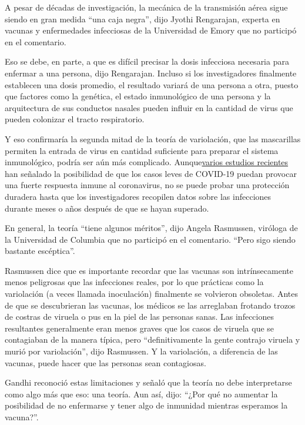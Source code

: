A pesar de décadas de investigación, la mecánica de la transmisión aérea
sigue siendo en gran medida ``una caja negra'', dijo Jyothi Rengarajan,
experta en vacunas y enfermedades infecciosas de la Universidad de Emory
que no participó en el comentario.

Eso se debe, en parte, a que es difícil precisar la dosis infecciosa
necesaria para enfermar a una persona, dijo Rengarajan. Incluso si los
investigadores finalmente establecen una dosis promedio, el resultado
variará de una persona a otra, puesto que factores como la genética, el
estado inmunológico de una persona y la arquitectura de sus conductos
nasales pueden influir en la cantidad de virus que pueden colonizar el
tracto respiratorio.

Y eso confirmaría la segunda mitad de la teoría de variolación, que las
mascarillas permiten la entrada de virus en cantidad suficiente para
preparar el sistema inmunológico, podría ser aún más complicado.
Aunque\href{https://www.nytimes3xbfgragh.onion/2020/08/16/health/coronavirus-immunity-antibodies.html}{varios
estudios recientes} han señalado la posibilidad de que los casos leves
de COVID-19 puedan provocar una fuerte respuesta inmune al coronavirus,
no se puede probar una protección duradera hasta que los investigadores
recopilen datos sobre las infecciones durante meses o años después de
que se hayan superado.

En general, la teoría ``tiene algunos méritos'', dijo Angela Rasmussen,
viróloga de la Universidad de Columbia que no participó en el
comentario. ``Pero sigo siendo bastante escéptica''.

Rasmussen dice que es importante recordar que las vacunas son
intrínsecamente menos peligrosas que las infecciones reales, por lo que
prácticas como la variolación (a veces llamada inoculación) finalmente
se volvieron obsoletas. Antes de que se descubrieran las vacunas, los
médicos se las arreglaban frotando trozos de costras de viruela o pus en
la piel de las personas sanas. Las infecciones resultantes generalmente
eran menos graves que los casos de viruela que se contagiaban de la
manera típica, pero ``definitivamente la gente contrajo viruela y murió
por variolación'', dijo Rasmussen. Y la variolación, a diferencia de las
vacunas, puede hacer que las personas sean contagiosas.

Gandhi reconoció estas limitaciones y señaló que la teoría no debe
interpretarse como algo más que eso: una teoría. Aun así, dijo: ``¿Por
qué no aumentar la posibilidad de no enfermarse y tener algo de
inmunidad mientras esperamos la vacuna?''.


